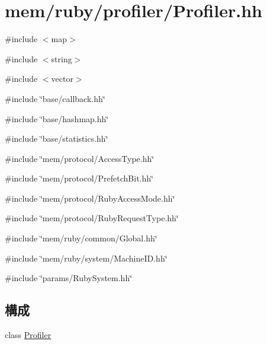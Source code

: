 \hypertarget{Profiler_8hh}{
\section{mem/ruby/profiler/Profiler.hh}
\label{Profiler_8hh}
}
{\ttfamily \#include $<$map$>$}\par
{\ttfamily \#include $<$string$>$}\par
{\ttfamily \#include $<$vector$>$}\par
{\ttfamily \#include \char`\"{}base/callback.hh\char`\"{}}\par
{\ttfamily \#include \char`\"{}base/hashmap.hh\char`\"{}}\par
{\ttfamily \#include \char`\"{}base/statistics.hh\char`\"{}}\par
{\ttfamily \#include \char`\"{}mem/protocol/AccessType.hh\char`\"{}}\par
{\ttfamily \#include \char`\"{}mem/protocol/PrefetchBit.hh\char`\"{}}\par
{\ttfamily \#include \char`\"{}mem/protocol/RubyAccessMode.hh\char`\"{}}\par
{\ttfamily \#include \char`\"{}mem/protocol/RubyRequestType.hh\char`\"{}}\par
{\ttfamily \#include \char`\"{}mem/ruby/common/Global.hh\char`\"{}}\par
{\ttfamily \#include \char`\"{}mem/ruby/system/MachineID.hh\char`\"{}}\par
{\ttfamily \#include \char`\"{}params/RubySystem.hh\char`\"{}}\par
\subsection*{構成}
\begin{DoxyCompactItemize}
\item 
class \hyperlink{classProfiler}{Profiler}
\end{DoxyCompactItemize}
